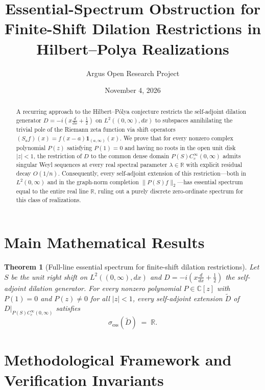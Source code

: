 \documentclass[10pt,reqno]{amsart}
\title[Essential-Spectrum Obstruction for Finite-Shift Dilation Operators]
{Essential-Spectrum Obstruction for Finite-Shift Dilation Restrictions in Hilbert--Polya Realizations}
\author{Argus Open Research Project}
\date{November 4, 2026}
\newtheorem{theorem}{Theorem}[section]
\theoremstyle{definition}
\begin{document}
\begin{abstract}
A recurring approach to the Hilbert--P\'olya conjecture restricts the self-adjoint dilation generator $D = -i(x\frac{d}{dx}+\frac{1}{2})$ on $L^2((0,\infty),dx)$ to subspaces annihilating the trivial pole of the Riemann zeta function via shift operators $(S_a f)(x) = f(x-a)\mathbf{1}_{(a,\infty)}(x)$. We prove that for every nonzero complex polynomial $P(z)$ satisfying $P(1)=0$ and having no roots in the open unit disk $|z|<1$, the restriction of $D$ to the common dense domain $P(S)C_c^\infty(0,\infty)$ admits singular Weyl sequences at every real spectral parameter $\lambda \in \mathbb{R}$ with explicit residual decay $O(1/n)$. Consequently, every self-adjoint extension of this restriction—both in $L^2(0,\infty)$ and in the graph-norm completion $\|P(S)f\|_2$—has essential spectrum equal to the entire real line $\mathbb{R}$, ruling out a purely discrete zero-ordinate spectrum for this class of realizations.
\end{abstract}
\maketitle

\section{Main Mathematical Results}
\begin{theorem}[Full-line essential spectrum for finite-shift dilation restrictions]
Let $S$ be the unit right shift on $L^2((0,\infty),dx)$ and $D = -i(x\frac{d}{dx}+\frac{1}{2})$ the self-adjoint dilation generator. For every nonzero polynomial $P \in \mathbb{C}[z]$ with $P(1)=0$ and $P(z)\neq 0$ for all $|z|<1$, every self-adjoint extension $\widetilde{D}$ of $D|_{P(S)C_c^\infty(0,\infty)}$ satisfies
\[
  \sigma_{\mathrm{ess}}(\widetilde{D}) \;=\; \mathbb{R}.
\]
\end{theorem}

\section{Methodological Framework and Verification Invariants}
\end{document}
